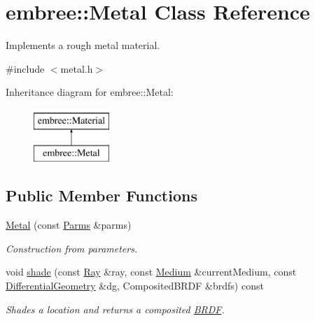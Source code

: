 \hypertarget{classembree_1_1_metal}{
\section{embree::Metal Class Reference}
\label{classembree_1_1_metal}
}


Implements a rough metal material.  




{\ttfamily \#include $<$metal.h$>$}

Inheritance diagram for embree::Metal:\begin{figure}[H]
\begin{center}
\leavevmode
\includegraphics[height=2.000000cm]{classembree_1_1_metal}
\end{center}
\end{figure}
\subsection*{Public Member Functions}
\begin{DoxyCompactItemize}
\item 
\hyperlink{classembree_1_1_metal_a83855b6ad04483ec33efc483066cd886}{Metal} (const \hyperlink{classembree_1_1_parms}{Parms} \&parms)
\begin{DoxyCompactList}\small\item\em Construction from parameters. \item\end{DoxyCompactList}\item 
void \hyperlink{classembree_1_1_metal_a6df7cc1be73ee906f56b92aec13c6ecf}{shade} (const \hyperlink{structembree_1_1_ray}{Ray} \&ray, const \hyperlink{classembree_1_1_medium}{Medium} \&currentMedium, const \hyperlink{structembree_1_1_differential_geometry}{DifferentialGeometry} \&dg, CompositedBRDF \&brdfs) const 
\begin{DoxyCompactList}\small\item\em Shades a location and returns a composited \hyperlink{classembree_1_1_b_r_d_f}{BRDF}. \item\end{DoxyCompactList}\end{DoxyCompactItemize}


